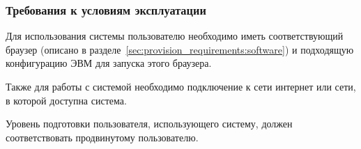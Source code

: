 \subsubsection{Требования к условиям эксплуатации}

Для использования системы пользователю необходимо иметь соответствующий браузер (описано в разделе~\ref{sec:provision_requirements:software}) и подходящую конфигурацию ЭВМ для запуска этого браузера.

Также для работы с системой необходимо подключение к сети интернет или сети, в которой доступна система.

Уровень подготовки пользователя, использующего систему, должен соответствовать продвинутому пользователю.
